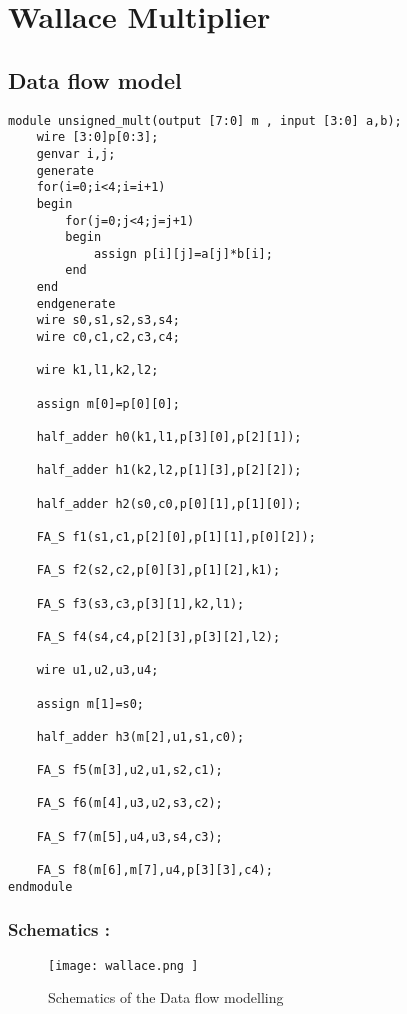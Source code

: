 \section*{Wallace Multiplier}

\subsection*{Data flow model}
\begin{verbatim}
module unsigned_mult(output [7:0] m , input [3:0] a,b);
	wire [3:0]p[0:3];
	genvar i,j;
	generate
	for(i=0;i<4;i=i+1)
	begin
		for(j=0;j<4;j=j+1)
		begin
			assign p[i][j]=a[j]*b[i];
		end
	end
	endgenerate
	wire s0,s1,s2,s3,s4;
	wire c0,c1,c2,c3,c4;	
	
	wire k1,l1,k2,l2;
	
	assign m[0]=p[0][0];
	
	half_adder h0(k1,l1,p[3][0],p[2][1]);
	
	half_adder h1(k2,l2,p[1][3],p[2][2]);
	
	half_adder h2(s0,c0,p[0][1],p[1][0]);
	
	FA_S f1(s1,c1,p[2][0],p[1][1],p[0][2]);
	
	FA_S f2(s2,c2,p[0][3],p[1][2],k1);
	
	FA_S f3(s3,c3,p[3][1],k2,l1);
	
	FA_S f4(s4,c4,p[2][3],p[3][2],l2);
	
	wire u1,u2,u3,u4;
	
	assign m[1]=s0;
	
	half_adder h3(m[2],u1,s1,c0);
	
	FA_S f5(m[3],u2,u1,s2,c1);
	
	FA_S f6(m[4],u3,u2,s3,c2);
	
	FA_S f7(m[5],u4,u3,s4,c3);
	
	FA_S f8(m[6],m[7],u4,p[3][3],c4);
endmodule
\end{verbatim}

\subsubsection*{Schematics : }
\begin{figure}[H]
    \centering
    \texttt{[image: 
		wallace.png
	]}
    \caption{Schematics of the Data flow modelling}
\end{figure}

